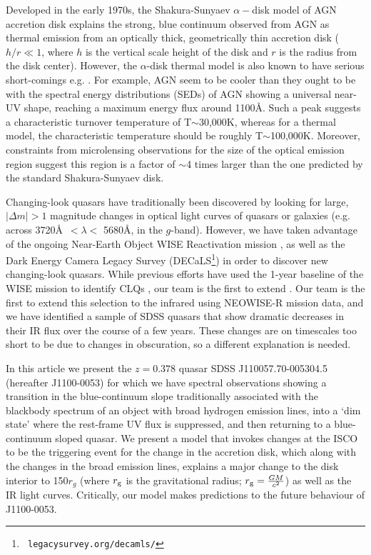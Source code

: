 \documentclass{nature}
\begin{document}
Developed in the early 1970s, the Shakura-Sunyaev $\alpha-$disk model
\cite{SS73} of AGN accretion disk explains the strong, blue continuum
observed from AGN as thermal emission from an optically thick,
geometrically thin accretion disk ($h / r \ll 1 $, where $h$ is the
vertical scale height of the disk and $r$ is the radius from the disk
center).  However, the \cite{SS73} $\alpha$-disk thermal model is also
known to have serious short-comings e.g.  \cite{Antonucci1999,
Koratkar_Blaes1999,Lawrence2012}. For example, AGN seem to be cooler
than they ought to be \cite[e.g., ][]{Lawrence2012} with the spectral
energy distributions (SEDs) of AGN showing a universal near-UV shape,
reaching a maximum energy flux around 1100\AA.  Such a peak suggests a
characteristic turnover temperature of T$\sim$30,000K, whereas for a thermal
model, the characteristic temperature should be roughly
T$\sim$100,000K. Moreover, constraints from microlensing observations
for the size of the optical emission region \cite[e.g.,][]{Pooley2007,
Morgan2010, Morgan2012, Mosquera2011} suggest this region is a factor
of $\sim$4 times larger than the one predicted by the standard
Shakura-Sunyaev disk.

Changing-look quasars have traditionally been discovered by looking
for large, $| \Delta m | >1$ magnitude changes in optical light curves
of quasars or galaxies (e.g. across 3720\AA\ $< \lambda <$ 5680\AA, in
the $g$-band). However, we have taken advantage of the ongoing
Near-Earth Object WISE Reactivation mission \cite[NEOWISE-R;
][]{Mainzer2014, Meisner2017a, Meisner2017b}, as well as the Dark
Energy Camera Legacy Survey (DECaLS\footnote{{\tt
legacysurvey.org/decamls/}}) in order to discover new changing-look
quasars. While previous efforts have used the 1-year
baseline of the WISE mission to identify CLQs \cite[e.g., []{Assef2017}, our team is the first to extend .
Our team is the first to extend this selection to the
infrared using NEOWISE-R mission data, and we have identified a sample
of SDSS quasars that show dramatic decreases in their IR flux over the
course of a few years. These changes are on timescales too short to be
due to changes in obscuration, so a different explanation is needed.

In this article we present the $z=0.378$ quasar SDSS
J110057.70-005304.5 (hereafter J1100-0053) for which we have spectral
observations showing a transition in the blue-continuum slope
traditionally associated with the blackbody spectrum of an object with
broad hydrogen emission lines, into a `dim state' where the rest-frame
UV flux is suppressed, and then returning to a blue-continuum sloped
quasar.  We present a model that invokes changes at the ISCO to be the
triggering event for the change in the accretion disk, which along
with the changes in the broad emission lines, explains a major change
to the disk interior to 150$r_{g}$ (where $r_{\rm g}$ is the
gravitational radius; $r_{\rm g}=\frac{GM}{c^2}$) as well as the IR
light curves. Critically, our model makes predictions to the future
behaviour of J1100-0053.
 
\end{document}
